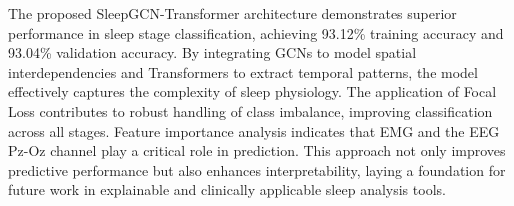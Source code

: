 


The proposed SleepGCN-Transformer architecture demonstrates superior performance in sleep stage classification, achieving 93.12\% training accuracy and 93.04\% validation accuracy. By integrating GCNs to model spatial interdependencies and Transformers to extract temporal patterns, the model effectively captures the complexity of sleep physiology. The application of Focal Loss contributes to robust handling of class imbalance, improving classification across all stages. Feature importance analysis indicates that EMG and the EEG Pz-Oz channel play a critical role in prediction. This approach not only improves predictive performance but also enhances interpretability, laying a foundation for future work in explainable and clinically applicable sleep analysis tools.
